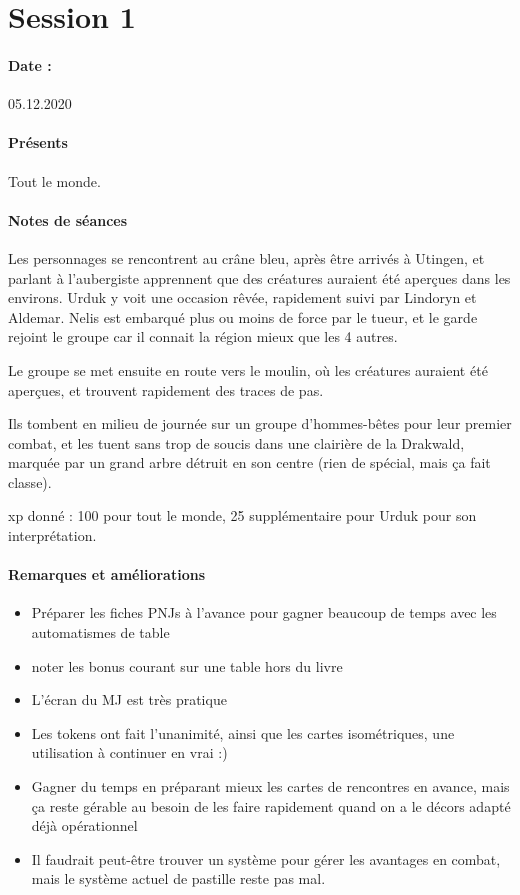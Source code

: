 \documentclass[10pt,a4paper]{book}
\begin{document}
\section{Session 1}
\paragraph{Date :}05.12.2020
\paragraph{Présents} Tout le monde.

\paragraph{Notes de séances}
Les personnages se rencontrent au crâne bleu, après être arrivés à Utingen, et parlant à l'aubergiste apprennent que des créatures auraient été aperçues dans les environs. Urduk y voit une occasion rêvée, rapidement suivi par Lindoryn et Aldemar. Nelis est embarqué plus ou moins de force par le tueur, et le garde rejoint le groupe car il connait la région mieux que les 4 autres.

Le groupe se met ensuite en route vers le moulin, où les créatures auraient été aperçues, et trouvent rapidement des traces de pas.

Ils tombent en milieu de journée sur un groupe d'hommes-bêtes pour leur premier combat, et les tuent sans trop de soucis dans une clairière de la Drakwald, marquée par un grand arbre détruit en son centre (rien de spécial, mais ça fait classe).

xp donné : 100 pour tout le monde, 25 supplémentaire pour Urduk pour son interprétation.

\paragraph{Remarques et améliorations} 
\begin{itemize}
\item Préparer les fiches PNJs à l'avance pour gagner beaucoup de temps avec les automatismes de table
\item noter les bonus courant sur une table hors du livre
\item L'écran du MJ est très pratique
\item Les tokens ont fait l'unanimité, ainsi que les cartes isométriques, une utilisation à continuer en vrai :)
\item Gagner du temps en préparant mieux les cartes de rencontres en avance, mais ça reste gérable au besoin de les faire rapidement quand on a le décors adapté déjà opérationnel
\item Il faudrait peut-être trouver un système pour gérer les avantages en combat, mais le système actuel de pastille reste pas mal.
\end{itemize}
\end{document}
